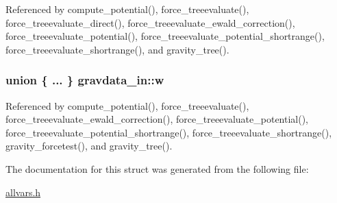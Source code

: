 Referenced by compute\_\-potential(), force\_\-treeevaluate(), force\_\-treeevaluate\_\-direct(), force\_\-treeevaluate\_\-ewald\_\-correction(), force\_\-treeevaluate\_\-potential(), force\_\-treeevaluate\_\-potential\_\-shortrange(), force\_\-treeevaluate\_\-shortrange(), and gravity\_\-tree().

\hypertarget{structgravdata__in_aa49666c565d68dcd6c3b6a6015f8a51f}{
\subsubsection[{w}]{\setlength{\rightskip}{0pt plus 5cm}union \{ ... \} 
   {\bf gravdata\_\-in::w}}}
\label{structgravdata__in_aa49666c565d68dcd6c3b6a6015f8a51f}


Referenced by compute\_\-potential(), force\_\-treeevaluate(), force\_\-treeevaluate\_\-ewald\_\-correction(), force\_\-treeevaluate\_\-potential(), force\_\-treeevaluate\_\-potential\_\-shortrange(), force\_\-treeevaluate\_\-shortrange(), gravity\_\-forcetest(), and gravity\_\-tree().



The documentation for this struct was generated from the following file:\begin{DoxyCompactItemize}
\item 
\hyperlink{allvars_8h}{allvars.h}\end{DoxyCompactItemize}
